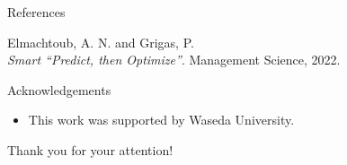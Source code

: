 \documentclass{beamer}
\begin{document}
\begin{frame}{References}
    \footnotesize
    \begin{thebibliography}{9}
        Elmachtoub, A. N. and Grigas, P.\\
        \textit{Smart “Predict, then Optimize”}.
        Management Science, 2022.
    \end{thebibliography}
\end{frame}

\begin{frame}{Acknowledgements}
    \begin{itemize}
        \item This work was supported by Waseda University.
    \end{itemize}
    \vspace{1.0cm}
    \centering
    {\Large Thank you for your attention!}
\end{frame}
\end{document}
